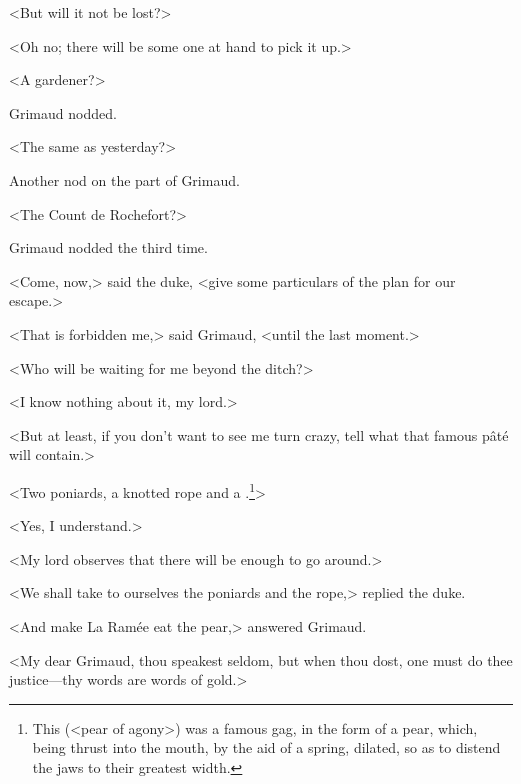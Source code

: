 <But will it not be lost?>

<Oh no; there will be some one at hand to pick it up.>

<A gardener?>

Grimaud nodded.

<The same as yesterday?>

Another nod on the part of Grimaud.

<The Count de Rochefort?>

Grimaud nodded the third time.

<Come, now,> said the duke, <give some particulars of the plan for our escape.>

<That is forbidden me,> said Grimaud, <until the last moment.>

<Who will be waiting for me beyond the ditch?>

<I know nothing about it, my lord.>

<But at least, if you don't want to see me turn crazy, tell what that famous pâté will contain.>

<Two poniards, a knotted rope and a .\footnote{This  (<pear of agony>) was a famous gag, in the form of a pear, which, being thrust into the mouth, by the aid of a spring, dilated, so as to distend the jaws to their greatest width.}> 

<Yes, I understand.>

<My lord observes that there will be enough to go around.>

<We shall take to ourselves the poniards and the rope,> replied the duke.

<And make La Ramée eat the pear,> answered Grimaud.

<My dear Grimaud, thou speakest seldom, but when thou dost, one must do thee justice—thy words are words of gold.> 